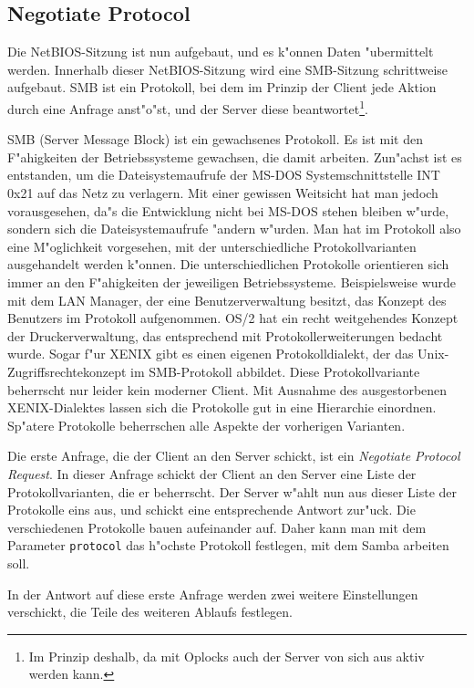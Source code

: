 \documentclass{scrartcl}
\newcommand{\param}{\texttt}
\newcommand{\defin}{\emph}
\begin{document}
\subsection*{Negotiate Protocol}

Die NetBIOS-Sitzung ist nun aufgebaut, und es k"onnen Daten
"ubermittelt werden. Innerhalb dieser NetBIOS-Sitzung wird eine
SMB-Sitzung schrittweise aufgebaut. SMB ist ein Protokoll, bei dem im
Prinzip der Client jede Aktion durch eine Anfrage anst"o"st, und der
Server diese beantwortet\footnote{Im Prinzip deshalb, da mit Oplocks
  auch der Server von sich aus aktiv werden kann.}.

SMB (Server Message Block) ist ein gewachsenes Protokoll. Es ist mit
den F"ahigkeiten der Betriebssysteme gewachsen, die damit arbeiten.
Zun"achst ist es entstanden, um die Dateisystemaufrufe der MS-DOS
Systemschnittstelle INT 0x21 auf das Netz zu verlagern. Mit einer
gewissen Weitsicht hat man jedoch vorausgesehen, da"s die Entwicklung
nicht bei MS-DOS stehen bleiben w"urde, sondern sich die
Dateisystemaufrufe "andern w"urden. Man hat im Protokoll also eine
M"oglichkeit vorgesehen, mit der unterschiedliche Protokollvarianten
ausgehandelt werden k"onnen. Die unterschiedlichen Protokolle
orientieren sich immer an den F"ahigkeiten der jeweiligen
Betriebssysteme. Beispielsweise wurde mit dem LAN Manager, der eine
Benutzerverwaltung besitzt, das Konzept des Benutzers im Protokoll
aufgenommen. OS/2 hat ein recht weitgehendes Konzept der
Druckerverwaltung, das entsprechend mit Protokollerweiterungen bedacht
wurde. Sogar f"ur XENIX gibt es einen eigenen Protokolldialekt, der
das Unix-Zugriffsrechtekonzept im SMB-Protokoll abbildet. Diese
Protokollvariante beherrscht nur leider kein moderner Client. Mit
Ausnahme des ausgestorbenen XENIX-Dialektes lassen sich die Protokolle
gut in eine Hierarchie einordnen. Sp"atere Protokolle beherrschen alle
Aspekte der vorherigen Varianten.

Die erste Anfrage, die der Client an den Server schickt, ist ein
\defin{Negotiate Protocol Request}. In dieser Anfrage schickt der
Client an den Server eine Liste der Protokollvarianten, die er
beherrscht. Der Server w"ahlt nun aus dieser Liste der Protokolle eins
aus, und schickt eine entsprechende Antwort zur"uck. Die verschiedenen
Protokolle bauen aufeinander auf. Daher kann man mit dem Parameter
\param{protocol} das h"ochste Protokoll festlegen, mit dem Samba
arbeiten soll.

In der Antwort auf diese erste Anfrage werden zwei weitere
Einstellungen verschickt, die Teile des weiteren Ablaufs festlegen.
\end{document}
